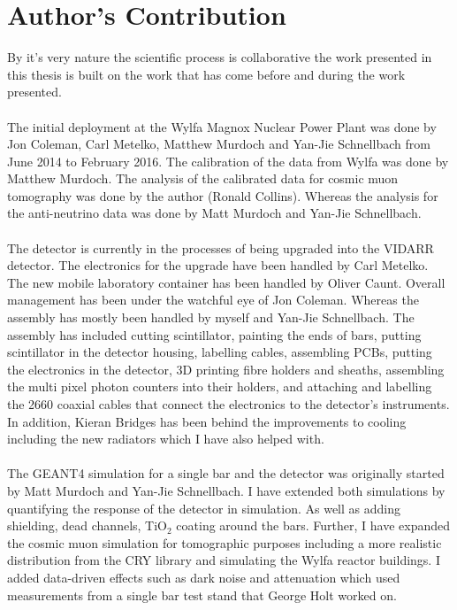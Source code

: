 \chapter{Author's Contribution}

By it's very nature the scientific process is collaborative the work presented in this thesis is built on the work that has come before and during the work presented. 
\\\\The initial deployment at the Wylfa Magnox Nuclear Power Plant was done by Jon Coleman, Carl Metelko, Matthew Murdoch and Yan-Jie Schnellbach from June 2014 to February 2016. The calibration of the data from Wylfa was done by Matthew Murdoch. The analysis of the calibrated data for cosmic muon tomography was done by the author (Ronald Collins). Whereas the analysis for the anti-neutrino data was done by Matt Murdoch and Yan-Jie Schnellbach. 
\\\\The detector is currently in the processes of being upgraded into the VIDARR detector. The electronics for the upgrade have been handled by Carl Metelko. The new mobile laboratory container has been handled by Oliver Caunt. Overall management has been under the watchful eye of Jon Coleman. Whereas the assembly has mostly been handled by myself and Yan-Jie Schnellbach. The assembly has included cutting scintillator, painting the ends of bars, putting scintillator in the detector housing, labelling cables, assembling PCBs, putting the electronics in the detector, 3D printing fibre holders and sheaths, assembling the multi pixel photon counters into their holders, and attaching and labelling the 2660 coaxial cables that connect the electronics to the detector's instruments. In addition, Kieran Bridges has been behind the improvements to cooling including the new radiators which I have also helped with. 
\\\\The GEANT4 simulation for a single bar and the detector was originally started by Matt Murdoch and Yan-Jie Schnellbach. I have extended both simulations by quantifying the response of the detector in simulation. As well as adding shielding, dead channels, TiO$_2$ coating around the bars. Further, I have expanded the cosmic muon simulation for tomographic purposes including a more realistic distribution from the CRY library and simulating the Wylfa reactor buildings. I added data-driven effects such as dark noise and attenuation which used measurements from a single bar test stand that George Holt worked on. 
